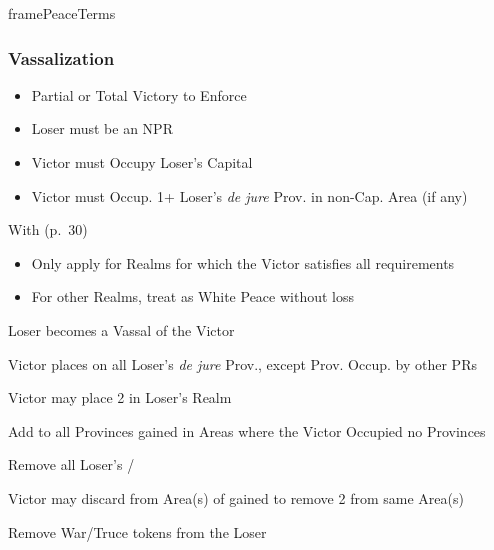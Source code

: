 \documentclass[10pt]{article}
\newlength{\fhPeaceTerms} \setlength\fhPeaceTerms{45.5\baselineskip}
\begin{document}
\begin{dynamiccontents*}{framePeaceTerms}
\begin{eubox}{\fhPeaceTerms}
\begin{multicols}{3}
		\subsubsection*{Vassalization}
		\begin{itemize}
			{
				\color{peaceReqColor}
				\item {}
				\begin{itemize}
					\item Partial or Total Victory to Enforce
					\item Loser must be an NPR
					\item Victor must Occupy Loser's Capital
					\item Victor must Occup. 1+ Loser's \emph{de jure} Prov. in non-Cap. Area (if any)
				\end{itemize}
			}
			\item With  (p.~30)
			\begin{itemize}
				\item Only apply for Realms for which the Victor satisfies all requirements
				\item For other Realms, treat as White Peace without \prestige loss
			\end{itemize}
			\item Loser becomes a Vassal of the Victor
			\item Victor places \vassalprovinces on all Loser's \emph{de jure} Prov., except Prov. Occup. by other PRs
			\item Victor may place 2 \influence in Loser's Realm
			\item Add \unrest to all Provinces gained in Areas where the Victor Occupied no Provinces
			\item Remove all Loser's \alliances/\marriages
			\item Victor may discard \claim from Area(s) of gained \vassalprovinces to remove 2 \unrest from same Area(s)
			\item Remove War/Truce tokens from the Loser
		\end{itemize}


\end{multicols}
\end{eubox}
\end{dynamiccontents*}
\end{document}
